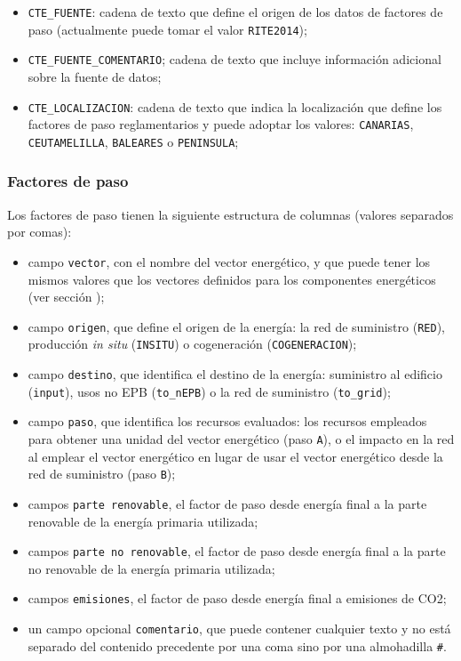\documentclass[10pt,notitlepage,oneside,a4paper]{article}
\begin{document}
\begin{itemize}
\item \texttt{CTE\_FUENTE}: cadena de texto que define el origen de los datos de factores de paso (actualmente puede tomar el valor \texttt{RITE2014});
\item \texttt{CTE\_FUENTE\_COMENTARIO}; cadena de texto que incluye información adicional sobre la fuente de datos;
\item \texttt{CTE\_LOCALIZACION}: cadena de texto que indica la localización que define los factores de paso reglamentarios y puede adoptar los valores: \texttt{CANARIAS}, \texttt{CEUTAMELILLA}, \texttt{BALEARES} o \texttt{PENINSULA};
\end{itemize}

\subsubsection{Factores de paso}

Los factores de paso tienen la siguiente estructura de columnas (valores separados por comas):

\begin{itemize}
\item campo \texttt{vector}, con el nombre del vector energético, y que puede tener los mismos valores que los vectores definidos para los componentes energéticos (ver sección );
\item campo \texttt{origen}, que define el origen de la energía: la red de suministro (\texttt{RED}), producción \textit{in situ} (\texttt{INSITU}) o cogeneración (\texttt{COGENERACION});
\item campo \texttt{destino}, que identifica el destino de la energía: suministro al edificio (\texttt{input}), usos no EPB (\texttt{to\_nEPB}) o la red de suministro (\texttt{to\_grid});
\item campo \texttt{paso}, que identifica los recursos evaluados: los recursos empleados para obtener una unidad del vector energético (paso \texttt{A}), o el impacto en la red al emplear el vector energético en lugar de usar el vector energético desde la red de suministro (paso \texttt{B});
\item campos \texttt{parte renovable}, el factor de paso desde energía final a la parte renovable de la energía primaria utilizada;
\item campos \texttt{parte no renovable}, el factor de paso desde energía final a la parte no renovable de la energía primaria utilizada;
\item campos \texttt{emisiones}, el factor de paso desde energía final a emisiones de CO2;
\item un campo opcional \texttt{comentario}, que puede contener cualquier texto y no está separado del contenido precedente por una coma sino por una almohadilla \texttt{\#}.
\end{itemize}
\end{document}
